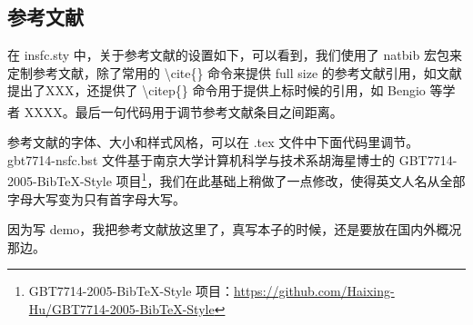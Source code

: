 \documentclass[a4paper,zihao=-4]{article}
\let\kaishu\relax %
\renewcommand{\citep}[1]{\textsuperscript{\cite{#1}}}
\begin{document}





\subsection{参考文献}
在 insfc.sty 中，关于参考文献的设置如下，可以看到，我们使用了 natbib 宏包来定制参考文献，除了常用的 \textbackslash cite\{\} 命令来提供 full size 的参考文献引用，如文献\cite{li2014object}提出了XXX，还提供了 \textbackslash citep\{\} 命令用于提供上标时候的引用，如 Bengio 等学者\citep{bengio2013representation} XXXX。最后一句代码用于调节参考文献条目之间距离。


参考文献的字体、大小和样式风格，可以在 .tex 文件中下面代码里调节。gbt7714-nsfc.bst 文件基于南京大学计算机科学与技术系胡海星博士的 GBT7714-2005-BibTeX-Style 项目\footnote{GBT7714-2005-BibTeX-Style 项目：\href{https://github.com/Haixing-Hu/GBT7714-2005-BibTeX-Style}{https://github.com/Haixing-Hu/GBT7714-2005-BibTeX-Style}}，我们在此基础上稍做了一点修改，使得英文人名从全部字母大写变为只有首字母大写。

% 		
% 		

因为写 demo，我把参考文献放这里了，真写本子的时候，还是要放在国内外概况那边。
\end{document}
